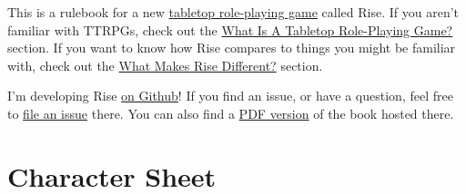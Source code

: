 \documentclass[oneside]{book} %
\begin{document}
This is a rulebook for a new \href{https://en.wikipedia.org/wiki/Tabletop_role-playing_game}{tabletop role-playing game} called Rise.
If you aren't familiar with TTRPGs, check out the \href{/rise/risese1.html}{What Is A Tabletop Role-Playing Game?} section.
If you want to know how Rise compares to things you might be familiar with, check out the \href{/rise/risese2.html}{What Makes Rise Different?} section.

I'm developing Rise \href{https://github.com/Vadskye/Rise}{on Github}! If you find an issue, or have a question, feel free to \href{https://github.com/Vadskye/Rise/issues/new/choose}{file an issue} there. You can also find a \href{https://github.com/Vadskye/Rise/raw/master/core_book/Rise.pdf}{PDF version} of the book hosted there.

\tableofcontents


















\appendix























\chapter{Character Sheet}
\end{document}
